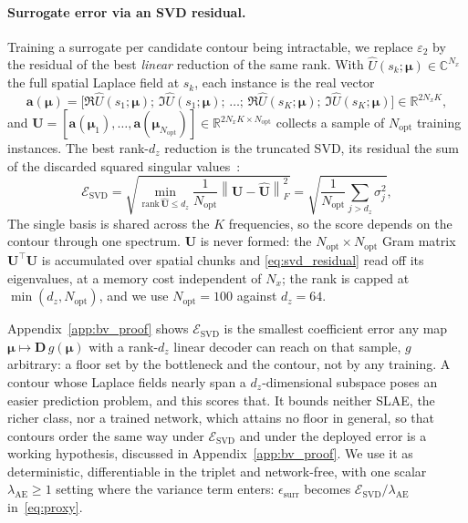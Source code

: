 ﻿\documentclass[a4paper,12pt]{article}
\theoremstyle{definition}
\theoremstyle{remark}
\newcommand{\C}{\mathbb{C}}
\newcommand{\vmu}{\bm{\mu}}
\newcommand{\R}{\mathbb{R}}
\begin{document}
\paragraph{Surrogate error via an SVD residual.}
Training a surrogate per candidate contour being intractable, we replace $\varepsilon_2$ by the residual of the best \emph{linear} reduction of the same rank. With $\hat{U}(s_k;\vmu) \in \C^{N_x}$ the full spatial Laplace field at $s_k$, each instance is the real vector
\begin{equation}
    \bm{a}(\vmu) = \bigl[\Re\hat{U}(s_1;\vmu);\, \Im\hat{U}(s_1;\vmu);\, \dots;\, \Re\hat{U}(s_K;\vmu);\, \Im\hat{U}(s_K;\vmu)\bigr] \in \R^{2 N_x K},
\end{equation}
and $\bm{U} = [\bm{a}(\vmu_1),\dots,\bm{a}(\vmu_{N_{\mathrm{opt}}})] \in \R^{2N_x K \times N_{\mathrm{opt}}}$ collects a sample of $N_{\mathrm{opt}}$ training instances. The best rank-$d_z$ reduction is the truncated SVD, its residual the sum of the discarded squared singular values~\cite{eckart1936,mirsky1960}:
\begin{equation}
\label{eq:svd_residual}
    \mathcal{E}_{\mathrm{SVD}}
    = \sqrt{\min_{\mathrm{rank}\,\hat{\bm{U}} \le d_z} \frac{1}{N_{\mathrm{opt}}}\left\|\bm{U} - \hat{\bm{U}}\right\|_F^2}
    = \sqrt{\frac{1}{N_{\mathrm{opt}}}\sum_{j > d_z}\sigma_j^2},
\end{equation}
The single basis is shared across the $K$ frequencies, so the score depends on the contour through one spectrum. $\bm{U}$ is never formed: the $N_{\mathrm{opt}} \times N_{\mathrm{opt}}$ Gram matrix $\bm{U}^\top\bm{U}$ is accumulated over spatial chunks and \eqref{eq:svd_residual} read off its eigenvalues, at a memory cost independent of $N_x$; the rank is capped at $\min(d_z, N_{\mathrm{opt}})$, and we use $N_{\mathrm{opt}} = 100$ against $d_z = 64$.

Appendix~\ref{app:bv_proof} shows $\mathcal{E}_{\mathrm{SVD}}$ is the smallest coefficient error any map $\vmu \mapsto \bm{D}\,g(\vmu)$ with a rank-$d_z$ linear decoder can reach on that sample, $g$ arbitrary: a floor set by the bottleneck and the contour, not by any training. A contour whose Laplace fields nearly span a $d_z$-dimensional subspace poses an easier prediction problem, and this scores that. It bounds neither SLAE, the richer class, nor a trained network, which attains no floor in general, so that contours order the same way under $\mathcal{E}_{\mathrm{SVD}}$ and under the deployed error is a working hypothesis, discussed in Appendix~\ref{app:bv_proof}. We use it as deterministic, differentiable in the triplet and network-free, with one scalar $\lambda_{\mathrm{AE}} \geq 1$ setting where the variance term enters: $\epsilon_{\mathrm{surr}}$ becomes $\mathcal{E}_{\mathrm{SVD}}/\lambda_{\mathrm{AE}}$ in~\eqref{eq:proxy}.
\end{document}
